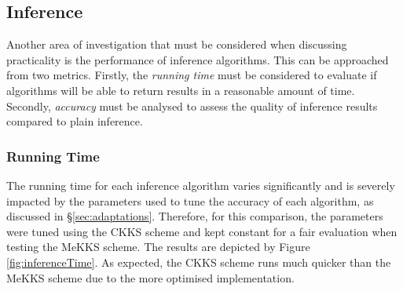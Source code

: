 \setlength{\leftskip}{0cm}

\subsection{Inference}
\setlength{\leftskip}{0.5cm}
\indent \indent
Another area of investigation that must be considered when discussing practicality is the performance of inference algorithms. This can be approached from two metrics. Firstly, the \textit{running time} must be considered to evaluate if algorithms will be able to return results in a reasonable amount of time. Secondly, \textit{accuracy} must be analysed to assess the quality of inference results compared to plain inference.

\setlength{\leftskip}{0cm}
\subsubsection{Running Time}
\setlength{\leftskip}{0.5cm}
\indent \indent
The running time for each inference algorithm varies significantly and is severely impacted by the parameters used to tune the accuracy of each algorithm, as discussed in §\ref{sec:adaptations}. Therefore, for this comparison, the parameters were tuned using the CKKS scheme and kept constant for a fair evaluation when testing the MeKKS scheme. The results are depicted by Figure \ref{fig:inferenceTime}. As expected, the CKKS scheme runs much quicker than the MeKKS scheme due to the more optimised implementation.

